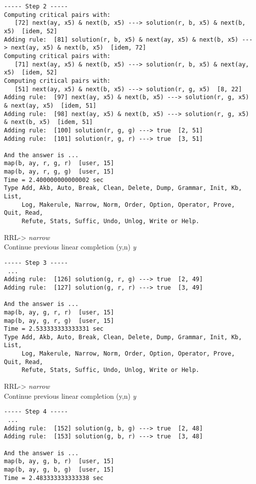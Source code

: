 \begin{verbatim}
----- Step 2 -----
Computing critical pairs with: 
   [72] next(ay, x5) & next(b, x5) ---> solution(r, b, x5) & next(b, x5)  [idem, 52]
Adding rule:  [81] solution(r, b, x5) & next(ay, x5) & next(b, x5) ---> next(ay, x5) & next(b, x5)  [idem, 72]
Computing critical pairs with: 
   [71] next(ay, x5) & next(b, x5) ---> solution(r, b, x5) & next(ay, x5)  [idem, 52]
Computing critical pairs with: 
   [51] next(ay, x5) & next(b, x5) ---> solution(r, g, x5)  [8, 22]
Adding rule:  [97] next(ay, x5) & next(b, x5) ---> solution(r, g, x5) & next(ay, x5)  [idem, 51]
Adding rule:  [98] next(ay, x5) & next(b, x5) ---> solution(r, g, x5) & next(b, x5)  [idem, 51]
Adding rule:  [100] solution(r, g, g) ---> true  [2, 51]
Adding rule:  [101] solution(r, g, r) ---> true  [3, 51]

And the answer is ...
map(b, ay, r, g, r)  [user, 15]
map(b, ay, r, g, g)  [user, 15]
Time = 2.400000000000002 sec
Type Add, Akb, Auto, Break, Clean, Delete, Dump, Grammar, Init, Kb, List,
     Log, Makerule, Narrow, Norm, Order, Option, Operator, Prove, Quit, Read,
     Refute, Stats, Suffic, Undo, Unlog, Write or Help.
\end{verbatim}
RRL-> {\em narrow}\\
Continue previous linear completion (y,n) {\em y}
\begin{verbatim}
----- Step 3 -----
 ...
Adding rule:  [126] solution(g, r, g) ---> true  [2, 49]
Adding rule:  [127] solution(g, r, r) ---> true  [3, 49]

And the answer is ...
map(b, ay, g, r, r)  [user, 15]
map(b, ay, g, r, g)  [user, 15]
Time = 2.533333333333331 sec
Type Add, Akb, Auto, Break, Clean, Delete, Dump, Grammar, Init, Kb, List,
     Log, Makerule, Narrow, Norm, Order, Option, Operator, Prove, Quit, Read,
     Refute, Stats, Suffic, Undo, Unlog, Write or Help.
\end{verbatim}
RRL-> {\em narrow}\\
Continue previous linear completion (y,n) {\em y}
\begin{verbatim}
----- Step 4 -----
 ...
Adding rule:  [152] solution(g, b, g) ---> true  [2, 48]
Adding rule:  [153] solution(g, b, r) ---> true  [3, 48]

And the answer is ...
map(b, ay, g, b, r)  [user, 15]
map(b, ay, g, b, g)  [user, 15]
Time = 2.483333333333338 sec
\end{verbatim}
\rm
\normalsize
